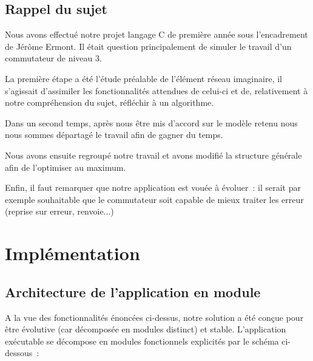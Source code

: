 \documentclass[a4paper,11pt]{article}
\begin{document}
\subsection{Rappel du sujet}

Nous avons effectué notre projet langage C de première année sous l'encadrement de Jérôme Ermont. Il était question principalement de simuler le travail d'un commutateur de niveau 3. 

La première étape a été l'étude préalable de l'élément réseau imaginaire, il s'agissait d'assimiler les fonctionnalités attendues de celui-ci et de, relativement à notre compréhension du sujet, réfléchir à un algorithme.

Dans un second temps, après nous être mis d'accord sur le modèle retenu nous nous sommes départagé le travail afin de gagner du temps.  

Nous avons ensuite regroupé notre travail et avons modifié la structure générale afin de l'optimiser au maximum. 

Enfin, il faut remarquer que notre application est vouée à évoluer : il serait par exemple souhaitable que le commutateur soit capable de mieux traiter les erreur (reprise sur erreur, renvoie...)

\section{Implémentation}
\subsection{Architecture de l'application en module}

A la vue des fonctionnalités énoncées ci-dessus, notre solution a été conçue pour être évolutive (car décomposée en modules distinct) et stable. L'application exécutable se décompose en modules fonctionnels explicités par le schéma ci-dessous :
\end{document}
